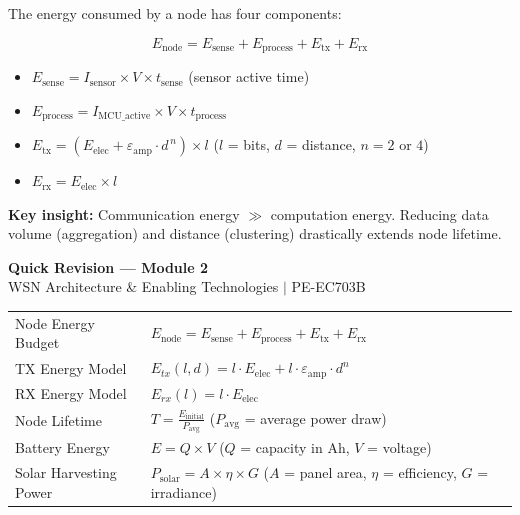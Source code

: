 \documentclass[12pt,a4paper]{article}
\renewcommand{\arraystretch}{1.45}
\begin{document}
The energy consumed by a node has four components:

\begin{tcolorbox}[formulabox, title={\textbf{Node Energy Model}}]
\[
E_{\text{node}} = E_{\text{sense}} + E_{\text{process}} + E_{\text{tx}} + E_{\text{rx}}
\]
\begin{itemize}[leftmargin=*, itemsep=4pt]
  \item $E_{\text{sense}} = I_{\text{sensor}} \times V \times t_{\text{sense}}$ \quad (sensor active time)
  \item $E_{\text{process}} = I_{\text{MCU\_active}} \times V \times t_{\text{process}}$
  \item $E_{\text{tx}} = (E_{\text{elec}} + \varepsilon_{\text{amp}} \cdot d^{\,n}) \times l$ \quad ($l$ = bits, $d$ = distance, $n=2$ or $4$)
  \item $E_{\text{rx}} = E_{\text{elec}} \times l$
\end{itemize}
\textbf{Key insight:} Communication energy $\gg$ computation energy. Reducing data volume (aggregation) and distance (clustering) drastically extends node lifetime.
\end{tcolorbox}

\newpage
\begin{center}
  {\large\bfseries\color{myred} Quick Revision --- Module 2}\\[3pt]
  {\small\color{mydark} WSN Architecture \& Enabling Technologies $|$ PE-EC703B}
\end{center}
\noindent{\color{myred}\rule{\linewidth}{1.2pt}}
\vspace{4pt}

\begin{tcolorbox}[formulabox, title={\textbf{Key Formulas at a Glance}}]
\renewcommand{\arraystretch}{1.35}
\begin{tabularx}{\linewidth}{B{5.0cm} X}
Node Energy Budget & $E_{\text{node}} = E_{\text{sense}} + E_{\text{process}} + E_{\text{tx}} + E_{\text{rx}}$ \\[4pt]
TX Energy Model & $E_{tx}(l,d) = l \cdot E_{\text{elec}} + l \cdot \varepsilon_{\text{amp}} \cdot d^n$ \\[4pt]
RX Energy Model & $E_{rx}(l) = l \cdot E_{\text{elec}}$ \\[4pt]
Node Lifetime & $T = \displaystyle\frac{E_{\text{initial}}}{P_{\text{avg}}}$ \quad ($P_{\text{avg}}$ = average power draw) \\[4pt]
Battery Energy & $E = Q \times V$ \quad ($Q$ = capacity in Ah, $V$ = voltage) \\[4pt]
Solar Harvesting Power & $P_{\text{solar}} = A \times \eta \times G$ \quad ($A$ = panel area, $\eta$ = efficiency, $G$ = irradiance)
\end{tabularx}
\end{tcolorbox}
\end{document}
